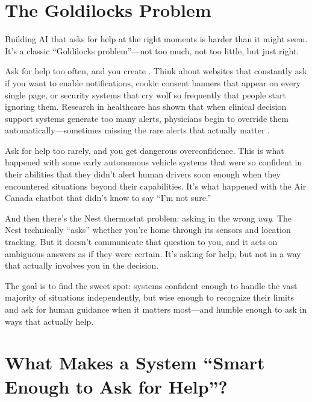 \section{The Goldilocks Problem}
\label{sec:goldilocks}

Building AI that asks for help at the right moments is harder than it might seem. It's a classic ``Goldilocks problem''---not too much, not too little, but just right.

Ask for help too often, and you create . Think about websites that constantly ask if you want to enable notifications, cookie consent banners that appear on every single page, or security systems that cry wolf so frequently that people start ignoring them. Research in healthcare has shown that when clinical decision support systems generate too many alerts, physicians begin to override them automatically---sometimes missing the rare alerts that actually matter \autocite{poly2020override}.

Ask for help too rarely, and you get dangerous overconfidence. This is what happened with some early autonomous vehicle systems that were so confident in their abilities that they didn't alert human drivers soon enough when they encountered situations beyond their capabilities. It's what happened with the Air Canada chatbot that didn't know to say ``I'm not sure.''

And then there's the Nest thermostat problem: asking in the wrong \emph{way}. The Nest technically ``asks'' whether you're home through its sensors and location tracking. But it doesn't communicate that question to you, and it acts on ambiguous answers as if they were certain. It's asking for help, but not in a way that actually involves you in the decision.

The goal is to find the sweet spot: systems confident enough to handle the vast majority of situations independently, but wise enough to recognize their limits and ask for human guidance when it matters most---and humble enough to ask in ways that actually help.

\section{What Makes a System ``Smart Enough to Ask for Help''?}
\label{sec:five-principles}

